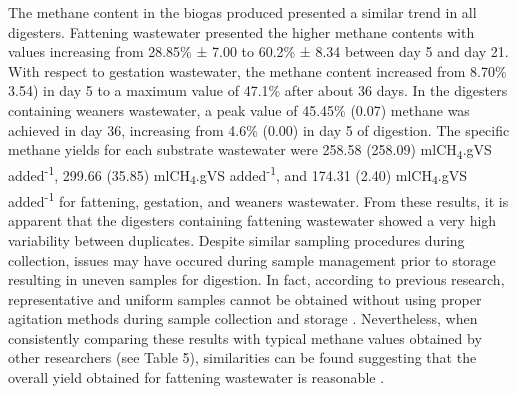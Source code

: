 The methane content in the biogas produced presented a similar trend in all digesters. Fattening wastewater presented the higher methane contents with values increasing from 28.85\% ± 7.00 to 60.2\% ± 8.34 between day 5 and day 21. With respect to gestation wastewater, the methane content increased from 8.70\% 3.54) in day 5 to a maximum value of 47.1\% after about 36 days. In the digesters containing weaners wastewater, a peak value of 45.45\% (0.07) methane was achieved in day 36, increasing from 4.6\% (0.00) in day 5 of digestion. The specific methane yields for each substrate wastewater were 258.58 (258.09) mlCH\textsubscript{4}.gVS added\textsuperscript{-1}, 299.66 (35.85) mlCH\textsubscript{4}.gVS added\textsuperscript{-1}, and 174.31 (2.40) mlCH\textsubscript{4}.gVS added\textsuperscript{-1} for fattening, gestation, and weaners wastewater. From these results, it is apparent that the digesters containing fattening wastewater showed a very high variability between duplicates. Despite similar sampling procedures during collection, issues may have occured during sample management prior to storage resulting in uneven samples for digestion. In fact,  according to previous research, representative and uniform samples cannot be obtained without using proper agitation methods during sample collection and storage \cite{Zhu_2004}. Nevertheless, when consistently comparing these results with typical methane values obtained by other researchers (see Table 5), similarities can be found suggesting that the overall yield obtained for fattening wastewater is  reasonable \cite{Guo_2012,Zhang_2014}.